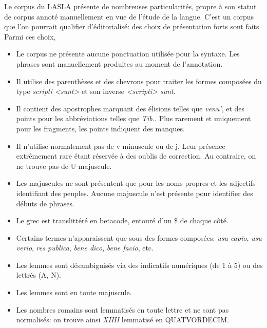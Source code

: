 Le corpus du LASLA présente de nombreuses particularités, propre à son statut de corpus annoté manuellement en vue de l'étude de la langue. C'est un corpus que l'on pourrait qualifier d'éditorialisé: des choix de présentation forts sont faits. Parmi ces choix, 
\begin{itemize}
    \item Le corpus ne présente aucune ponctuation utilisée pour la syntaxe. Les phrases sont manuellement produites au moment de l'annotation.  
    \item Il utilise des parenthèses et des chevrons pour traiter les formes composées du type \textit{scripti <sunt>} et son inverse \textit{<scripti> sunt}.
    \item Il contient des apostrophes marquant des élisions  telles que \textit{venu'}, et des points pour les abbréviations telles que \textit{Tib.}. Plus rarement et uniquement pour les fragments, les points indiquent des manques.
    \item Il n'utilise normalement pas de v minuscule ou de j. Leur présence extrêmement rare étant réservée à des oublis de correction. Au contraire, on ne trouve pas de U majuscule.
    \item Les majuscules ne sont présentent que pour les noms propres et les adjectifs identifiant des peuples. Aucune majuscule n'est présente pour identifier des débuts de phrases.
    \item Le grec est translittéré en betacode, entouré d'un \$ de chaque côté.
    \item Certains termes n'apparaissent que sous des formes composées: \textit{usu capio}, \textit{usu verio}, \textit{res publica}, \textit{bene dico}, \textit{bene facio}, etc.
    \item Les lemmes sont désambiguisés via des indicatifs numériques (de 1 à 5) ou des lettrés (A, N).
    \item Les lemmes sont en toute majuscule.
    \item Les nombres romains sont lemmatisés en toute lettre et ne sont pas normalisés: on trouve ainsi \textit{XIIII} lemmatisé en QUATVORDECIM.
\end{itemize}
